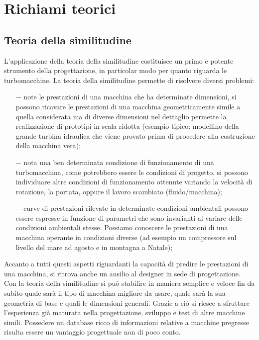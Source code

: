 \chapter{Richiami teorici}
\section{Teoria della similitudine}
L’applicazione della teoria della similitudine costituisce un primo e potente strumento della progettazione, in particolar modo per quanto riguarda le turbomacchine. La teoria della similitudine permette di risolvere diversi problemi:
\begin{itemize}
\item[$-$] note le prestazioni di una macchina che ha determinate dimensioni,
si possono ricavare le prestazioni di una macchina geometricamente simile a quella considerata ma di diverse dimensioni nel dettaglio permette la realizzazione di prototipi in scala ridotta (esempio tipico: modellino della grande turbina idraulica che viene provato prima di procedere alla costruzione della macchina vera);
\item[$-$] nota una ben determinata condizione di funzionamento di una turbomacchina, come potrebbero essere le condizioni di progetto, si possono individuare altre condizioni di funzionamento ottenute variando la velocità di rotazione, la portata, oppure il lavoro scambiato (ﬂuido/macchina);
\item[$-$] curve di prestazioni rilevate in determinate condizioni ambientali possono essere espresse in funzione di parametri che sono invarianti al variare delle condizioni ambientali stesse. Possiamo conoscere le prestazioni di una macchina operante in condizioni diverse (ad esempio un compressore sul livello del mare ad agosto e in montagna a Natale);
\end{itemize}
Accanto a tutti questi aspetti riguardanti la capacità di predire le prestazioni di una macchina, si ritrova anche un ausilio al designer in sede di progettazione. Con la teoria della similitudine si può stabilire in maniera semplice e veloce fin da subito quale sarà il tipo di macchina migliore da usare, quale sarà la sua geometria di base e quali le dimensioni generali. Grazie a ciò si riesce a sfruttare l’esperienza già maturata nella progettazione, sviluppo e test di altre macchine simili. Possedere un database ricco di informazioni relative a macchine pregresse risulta essere un vantaggio progettuale non di poco conto.


